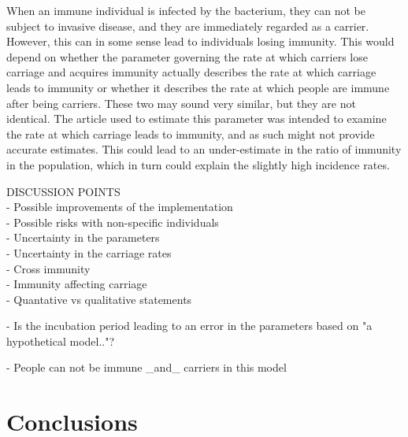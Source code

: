 \documentclass[10pt,a4paper]{article}
\begin{document}
When an immune individual is infected by the bacterium, they can not be subject to invasive disease, and they are immediately regarded as a carrier. However, this can in some sense lead to individuals losing immunity. This would depend on whether the parameter governing the rate at which carriers lose carriage and acquires immunity actually describes the rate at which carriage leads to immunity or whether it describes the rate at which people are immune after being carriers. These two may sound very similar, but they are not identical. The article used to estimate this parameter was intended to examine the rate at which carriage leads to immunity, and as such might not provide accurate estimates. This could lead to an under-estimate in the ratio of immunity in the population, which in turn could explain the slightly high incidence rates.

DISCUSSION POINTS \\
 - Possible improvements of the implementation \\
 - Possible risks with non-specific individuals \\
 - Uncertainty in the parameters \\
 - Uncertainty in the carriage rates \\
 - Cross immunity \\
 - Immunity affecting carriage \\
 - Quantative vs qualitative statements

- Is the incubation period leading to an error in the parameters based on "a hypothetical model.."?

- People can not be immune _and_ carriers in this model

\section{Conclusions}



\newpage

\begin{appendices}


\end{appendices}



\end{document}
